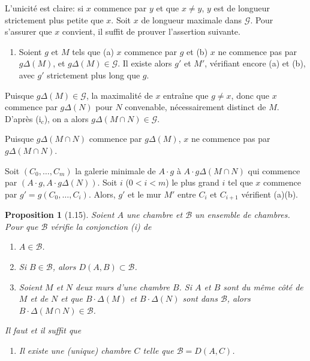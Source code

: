 \documentclass[12pt]{article}
\newtheorem{proposition}[theoreme]{Proposition}
\theoremstyle{remark}
\begin{document}
L'unicité est claire: si $x$ commence par $y$ et que $x \neq y$, $y$ est de longueur strictement plus petite que $x$. Soit $x$ de longueur maximale dans $\mathscr{G}$. Pour s'assurer que $x$ convient, il suffit de prouver l'assertion suivante.
\begin{enumerate}
\item[(*)] Soient $g$ et $M$ tels que (a) $x$ commence par $g$ et (b) $x$ ne commence pas par $g \Delta(M)$, et $g \Delta(M) \in \mathscr{G}$. Il existe alors $g'$ et $M'$, vérifiant encore (a) et (b), avec $g'$ strictement plus long que $g$.
\end{enumerate}

Puisque $g \Delta(M) \in \mathscr{G}$, la maximalité de $x$ entraîne que $g \neq x$, donc que $x$ commence par $g \Delta(N)$ pour $N$ convenable, nécessairement distinct de $M$. D'après (i$_c$), on a alors $g \Delta(M \cap N) \in \mathscr{G}$.

Puisque $g \Delta(M \cap N)$ commence par $g \Delta(M)$, $x$ ne commence pas par $g \Delta(M \cap N)$.

Soit $(C_0, \ldots, C_m)$ la galerie minimale de $A \cdot g$ à $A \cdot g \Delta(M \cap N)$ qui commence par $(A \cdot g, A \cdot g \Delta(N))$. Soit $i$ ($0 < i < m$) le plus grand $i$ tel que $x$ commence par $g' = g(C_0, \ldots, C_i)$. Alors, $g'$ et le mur $M'$ entre $C_i$ et $C_{i+1}$ vérifient (a)(b).

\begin{center}
\end{center}

\begin{proposition}[1.15]
Soient $A$ une chambre et $\mathscr{B}$ un ensemble de chambres. Pour que $\mathscr{B}$ vérifie la conjonction (i) de
\begin{enumerate}
\item[(i$_a$)] $A \in \mathscr{B}$.
\item[(i$_b$)] Si $B \in \mathscr{B}$, alors $D(A, B) \subset \mathscr{B}$.
\item[(i$_c$)] Soient $M$ et $N$ deux murs d'une chambre $B$. Si $A$ et $B$ sont du même côté de $M$ et de $N$ et que $B \cdot \Delta(M)$ et $B \cdot \Delta(N)$ sont dans $\mathscr{B}$, alors $B \cdot \Delta(M \cap N) \in \mathscr{B}$.
\end{enumerate}
Il faut et il suffit que
\begin{enumerate}
\item[(ii)] Il existe une (unique) chambre $C$ telle que $\mathscr{B} = D(A, C)$.
\end{enumerate}
\end{proposition}
\end{document}
